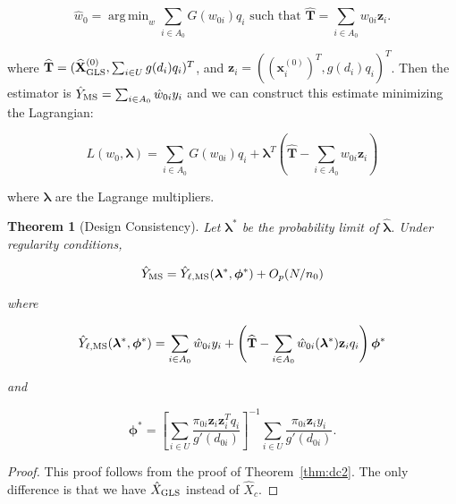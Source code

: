 \documentclass[12pt]{article}
\newtheorem{theorem}{Theorem}
\DeclareMathOperator*{\argmin}{arg\,min}
\renewcommand{\bf}[1]{\mathbf{#1}}
\begin{document}
\begin{equation}\label{eq:dc3}
  \hat w_0 = \argmin_w \sum_{i \in A_0} G(w_{0i}) q_i \text{ such that }
  \widehat{\bf{T}} = \sum_{i \in A_0} w_{0i} \bf z_i.
\end{equation}

where $\widehat{\bf{T}} = (\widehat{\bf X}_{\rm{GLS}}^{(0)},
\sum_{i \in U} g(d_i) q_i)^T$,
and $\bf z_i = ((\bf x_i^{(0)})^T, g(d_i)q_i)^T$. Then
the estimator is $\hat Y_{\rm MS} = \sum_{i \in A_0} \hat w_{0i} y_i$ and we can construct
this estimate minimizing the Lagrangian:

$$
L(w_{0}, \bm \lambda) = \sum_{i \in A_0} G(w_{0i}) q_i + {\bm \lambda}^T
\left(\widehat{\bf{T}} - \sum_{i \in A_0} w_{0i} \bf z_i\right)
$$

where $\bm \lambda$ are the Lagrange multipliers.


\begin{theorem}[Design Consistency]
  Let $\bm \lambda^*$ be the probability limit of $\hat{\bm \lambda}$.
  Under regularity conditions,

  $$\hat Y_{\rm MS} = \hat Y_{\ell, \rm MS}(\bm \lambda^*, \bm \phi^*) + O_p(N / n_0)$$

  where

  $$
  \hat Y_{\ell, \rm MS}(\bm \lambda^*, \bm \phi^*) = \sum_{i \in A_0} \hat w_{0i} y_i + \left(
    \widehat{\bf T} - \sum_{i \in A_0} \hat w_{0i}(\bm \lambda^*) \bf z_i q_i
  \right)\bm \phi^*
  $$

  and 

  $$
  \bm \phi^* = 
  \left[\sum_{i \in U} \frac{\pi_{0i} \bf z_i \bf z_i^T q_i}{g'(d_{0i})}\right]^{-1}
  \sum_{i \in U} \frac{\pi_{0i} \bf z_i y_i}{g'(d_{0i})}.
  $$
\end{theorem}

\begin{proof}
  This proof follows from the proof of Theorem~\ref{thm:dc2}. The only
  difference is that we have $\hat X_{\rm GLS}$ instead of $\hat X_c$.
\end{proof}
\end{document}
